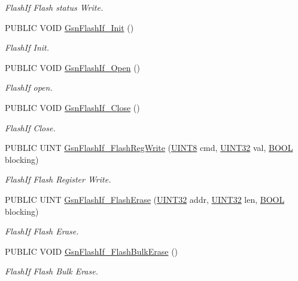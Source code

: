 \begin{DoxyCompactItemize}
\begin{DoxyCompactList}\small\item\em FlashIf Flash status Write. \end{DoxyCompactList}\item 
PUBLIC VOID \hyperlink{a00647_gaca0cbeb5224273baff05b9bb8f18f28f}{GsnFlashIf\_\-Init} ()
\begin{DoxyCompactList}\small\item\em FlashIf Init. \end{DoxyCompactList}\item 
PUBLIC VOID \hyperlink{a00647_ga2e45a3d239aacf23775f49d45451cb39}{GsnFlashIf\_\-Open} ()
\begin{DoxyCompactList}\small\item\em FlashIf open. \end{DoxyCompactList}\item 
PUBLIC VOID \hyperlink{a00647_ga35472b38e5592af65b2c3a043f12804a}{GsnFlashIf\_\-Close} ()
\begin{DoxyCompactList}\small\item\em FlashIf Close. \end{DoxyCompactList}\item 
PUBLIC UINT \hyperlink{a00647_ga9984f334abe4f56660d9c05462bfd0cf}{GsnFlashIf\_\-FlashRegWrite} (\hyperlink{a00660_gab27e9918b538ce9d8ca692479b375b6a}{UINT8} cmd, \hyperlink{a00660_gae1e6edbbc26d6fbc71a90190d0266018}{UINT32} val, \hyperlink{a00660_ga1f04022c0a182c51c059438790ea138c}{BOOL} blocking)
\begin{DoxyCompactList}\small\item\em FlashIf Flash Register Write. \end{DoxyCompactList}\item 
PUBLIC UINT \hyperlink{a00647_gaca1b3713dbed6c6ebc74ffd2c690aeea}{GsnFlashIf\_\-FlashErase} (\hyperlink{a00660_gae1e6edbbc26d6fbc71a90190d0266018}{UINT32} addr, \hyperlink{a00660_gae1e6edbbc26d6fbc71a90190d0266018}{UINT32} len, \hyperlink{a00660_ga1f04022c0a182c51c059438790ea138c}{BOOL} blocking)
\begin{DoxyCompactList}\small\item\em FlashIf Flash Erase. \end{DoxyCompactList}\item 
PUBLIC VOID \hyperlink{a00647_gac89f308125de8d40656d8a9e77decc7e}{GsnFlashIf\_\-FlashBulkErase} ()
\begin{DoxyCompactList}\small\item\em FlashIf Flash Bulk Erase. \end{DoxyCompactList}\item 

\end{DoxyCompactItemize}

